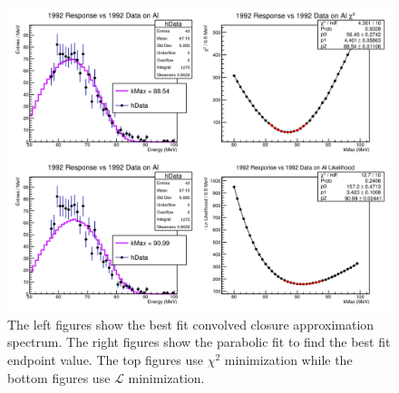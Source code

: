 

\begin{figure}[h]
  \centering
  \includegraphics[width=0.8\linewidth]{figures/png/1992_resp_1992_Al_data_allPlots_singleK.png}
  \caption{The left figures show the best fit convolved closure approximation spectrum. The right figures
  show the parabolic fit to find the best fit endpoint value. The top figures use $\chi ^2$ 
  minimization while the bottom figures use $\mathcal{L}$ minimization.}
  \label{fig:1992AlFits}
\end{figure}


